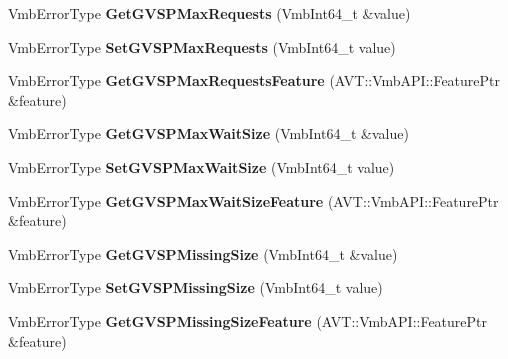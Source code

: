 \begin{DoxyCompactItemize}
\item 
\hypertarget{classMakoCamera_aa3917ad5ae475519a6b605daec16961c}{Vmb\-Error\-Type {\bfseries Get\-G\-V\-S\-P\-Max\-Requests} (Vmb\-Int64\-\_\-t \&value)}\label{classMakoCamera_aa3917ad5ae475519a6b605daec16961c}

\item 
\hypertarget{classMakoCamera_aecef8ee1e4f3271e674083f5f2491c61}{Vmb\-Error\-Type {\bfseries Set\-G\-V\-S\-P\-Max\-Requests} (Vmb\-Int64\-\_\-t value)}\label{classMakoCamera_aecef8ee1e4f3271e674083f5f2491c61}

\item 
\hypertarget{classMakoCamera_afff9ac2f135aa863465846fe674b8ed5}{Vmb\-Error\-Type {\bfseries Get\-G\-V\-S\-P\-Max\-Requests\-Feature} (A\-V\-T\-::\-Vmb\-A\-P\-I\-::\-Feature\-Ptr \&feature)}\label{classMakoCamera_afff9ac2f135aa863465846fe674b8ed5}

\item 
\hypertarget{classMakoCamera_a94aae0f8aa43f319c93eb9d46d6e8fa5}{Vmb\-Error\-Type {\bfseries Get\-G\-V\-S\-P\-Max\-Wait\-Size} (Vmb\-Int64\-\_\-t \&value)}\label{classMakoCamera_a94aae0f8aa43f319c93eb9d46d6e8fa5}

\item 
\hypertarget{classMakoCamera_a82772e8438d2410f239281c0679b7517}{Vmb\-Error\-Type {\bfseries Set\-G\-V\-S\-P\-Max\-Wait\-Size} (Vmb\-Int64\-\_\-t value)}\label{classMakoCamera_a82772e8438d2410f239281c0679b7517}

\item 
\hypertarget{classMakoCamera_ab344ec2b890e217e8bdfad5194077514}{Vmb\-Error\-Type {\bfseries Get\-G\-V\-S\-P\-Max\-Wait\-Size\-Feature} (A\-V\-T\-::\-Vmb\-A\-P\-I\-::\-Feature\-Ptr \&feature)}\label{classMakoCamera_ab344ec2b890e217e8bdfad5194077514}

\item 
\hypertarget{classMakoCamera_a0064bf9f30aa6da65622657fd5d6903d}{Vmb\-Error\-Type {\bfseries Get\-G\-V\-S\-P\-Missing\-Size} (Vmb\-Int64\-\_\-t \&value)}\label{classMakoCamera_a0064bf9f30aa6da65622657fd5d6903d}

\item 
\hypertarget{classMakoCamera_a447352fe8f57f6c3b5c503b45450ae68}{Vmb\-Error\-Type {\bfseries Set\-G\-V\-S\-P\-Missing\-Size} (Vmb\-Int64\-\_\-t value)}\label{classMakoCamera_a447352fe8f57f6c3b5c503b45450ae68}

\item 
\hypertarget{classMakoCamera_ae9ef22d7546e4734c134619ae8bd7faa}{Vmb\-Error\-Type {\bfseries Get\-G\-V\-S\-P\-Missing\-Size\-Feature} (A\-V\-T\-::\-Vmb\-A\-P\-I\-::\-Feature\-Ptr \&feature)}\label{classMakoCamera_ae9ef22d7546e4734c134619ae8bd7faa}


\end{DoxyCompactItemize}
